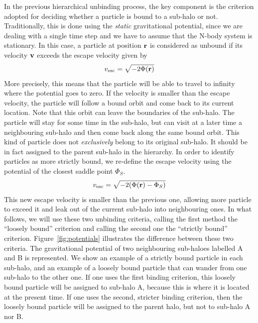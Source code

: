 \documentclass[a4paper,twocolumn,fleqn,usenatbib]{mnras}
\begin{document}
In the previous hierarchical unbinding process, the key component is
the criterion adopted for deciding whether a particle is bound to a
sub-halo or not.  Traditionally, this is done using the {\it static}
gravitational potential, since we are dealing with a single time step
and we have to assume that the N-body system is stationary.  In this
case, a particle at position ${\bf r}$ is considered as unbound if its
velocity ${\bf v}$ exceeds the escape velocity given by
\begin{equation}
v_{\rm esc} = \sqrt{- 2\Phi(\mathbf{r})} 
\label{eq:boundv}
\end{equation}
More precisely, this means that the particle will be able to travel to
infinity where the potential goes to  zero. If the velocity is smaller
than the escape  velocity, the particle will follow a  bound orbit and
come back to its current location.  Note that this orbit can leave the
boundaries of the  sub-halo.  The particle will stay for  some time in
the sub-halo,  but can visit at  a later time a  neighbouring sub-halo
and then come back along the  same bound orbit.  This kind of particle
does not {\it exclusively} belong  to its original sub-halo. It should
be in fact assigned to the parent sub-halo in the hierarchy.  In order
to identify particles as more  strictly bound, we re-define the escape
velocity using the potential of the closest saddle point $\Phi_S$.
\begin{equation}
v_{\rm esc} = \sqrt{- 2(\Phi(\mathbf{r})-\Phi_S)} 
\label{eq:boundv_corr}
\end{equation}
This new  escape velocity is  smaller than the previous  one, allowing
more particle to  exceed it and leak out of  the current sub-halo into
neighbouring ones.  In what  follows, we will  use these two unbinding
criteria, calling the first method the ``loosely bound'' criterion and
calling   the   second   one   the   ``strictly   bound''   criterion.
Figure~\ref{fig:potentials} illustrates  the difference  between these
two  criteria.   The  gravitational  potential  of   two  neighbouring
sub-haloes labelled A  and B is represented.  We show  an example of a
strictly bound particle in each sub-halo,  and an example of a loosely
bound particle that can wander from one sub-halo to the other one.  If
one uses the first binding criterion, this loosely bound particle
will be  assigned to sub-halo A,  because this is where  it is located at
the present time.  If one uses the second, stricter binding criterion,
then the loosely bound particle will be assigned to the parent halo, but
not to sub-halo A nor B.
\end{document}
